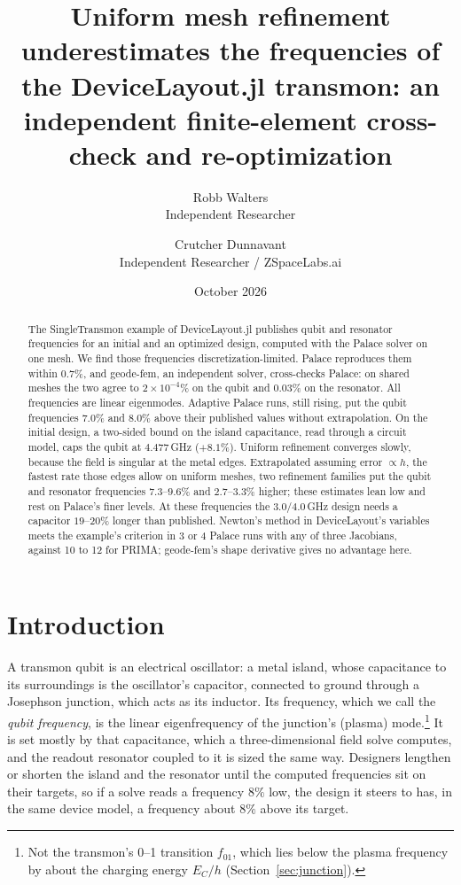 \documentclass{anvil-paper}
\title{Uniform mesh refinement underestimates the frequencies of the
DeviceLayout.jl transmon: an independent finite-element cross-check and
re-optimization}
\author{Robb Walters\\
  {\normalsize Independent Researcher}
  \and Crutcher Dunnavant\\
  {\normalsize Independent Researcher / ZSpaceLabs.ai}}
\date{October 2026}
\begin{document}
\maketitle

\begin{abstract}
The SingleTransmon example of DeviceLayout.jl publishes qubit and
resonator frequencies for an initial and an optimized design, computed
with the Palace solver on one mesh. We find those
frequencies discretization-limited. Palace reproduces them within
$0.7\%$, and geode-fem, an independent solver, cross-checks Palace: on
shared meshes the two agree to $2\times10^{-4}\%$ on the qubit and
$0.03\%$ on the resonator. All frequencies are linear eigenmodes. Adaptive
Palace runs, still rising, put the qubit frequencies $7.0\%$ and $8.0\%$ above their
published values without extrapolation. On the initial design, a two-sided
bound on the island capacitance, read through a circuit model, caps the
qubit at $4.477$\,GHz ($+8.1\%$). Uniform refinement converges slowly, because the field is singular at the metal edges.
Extrapolated assuming error $\propto h$, the fastest rate those edges allow on uniform meshes, two refinement families put the qubit and
resonator frequencies $7.3$--$9.6\%$ and $2.7$--$3.3\%$ higher; these estimates lean low and rest on
Palace's finer levels. At these frequencies the $3.0$/$4.0$\,GHz
design needs a capacitor $19$--$20\%$ longer than published. Newton's
method in DeviceLayout's variables meets the example's criterion in 3 or
4 Palace runs with any of three Jacobians, against 10 to 12 for PRIMA;
geode-fem's shape derivative gives no advantage here.
\end{abstract}

\section{Introduction}
\label{sec:intro}

A transmon qubit is an electrical oscillator: a metal island, whose
capacitance to its surroundings is the oscillator's capacitor, connected
to ground through a Josephson junction, which acts as its inductor. Its
frequency, which we call the \emph{qubit frequency}, is the linear
eigenfrequency of the junction's (plasma) mode.\footnote{Not the
transmon's 0--1 transition $f_{01}$, which lies below the plasma frequency
by about the charging energy $E_C/h$ (Section~\ref{sec:junction}).} It is
set mostly by that capacitance, which a three-dimensional field solve
computes, and the readout resonator coupled to it is sized the same way. Designers lengthen or shorten the island and the resonator until
the computed frequencies sit on their targets, so if a solve reads a
frequency $8\%$ low, the design it steers to has, in the same device
model, a frequency about $8\%$ above its target.
\end{document}
